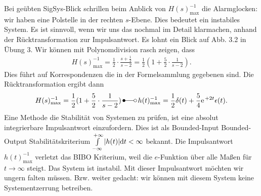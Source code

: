 \begin{ExCalc}
Bei geübten SigSys-Blick schrillen beim Anblick von $H(s)_\mathrm{max}^{-1}$
die Alarmglocken: wir haben eine Polstelle in der rechten $s$-Ebene.
Dies bedeutet ein instabiles System.
Es ist sinnvoll, wenn wir uns das nochmal im Detail klarmachen, anhand der
Rücktransformation zur Impulsantwort.
Es lohnt ein Blick auf Abb. 3.2 in Übung 3.
%
Wir können mit Polynomdivision rasch zeigen, dass
\begin{align}
H(s)_\mathrm{max}^{-1} = \frac{1}{2}\cdot\frac{s+\frac{1}{2}}{s-2}
= \frac{1}{2} ( 1 + \frac{5}{2}\cdot\frac{1}{s-2}).
\end{align}
Dies führt auf Korrespondenzen die in der Formelsammlung gegebenen
sind.
Die Rücktransformation ergibt dann
\begin{align}
H(s)_\mathrm{max}^{-1} = \frac{1}{2} ( 1 + \frac{5}{2}\cdot\frac{1}{s-2})
\,\Laplace\,
h(t)_\mathrm{max}^{-1} = \frac{1}{2}\delta(t) + \frac{5}{4}\e^{+2 t}\epsilon(t).
\end{align}
%
Eine Methode die Stabilität von Systemen zu prüfen, ist eine absolut integrierbare
Impulsantwort einzufordern. Dies ist als Bounded-Input Bounded-Output
Stabilitätskriterium
$\int\limits_{-\infty}^{+\infty} |h(t)|\mathrm{d} t < \infty$
bekannt.
Die Impulsantwort $h(t)_\mathrm{max}^{-1} $ verletzt das BIBO Kriterium, weil
die $e$-Funktion über alle Maßen für $t\to\infty$ steigt. Das System ist
instabil.
Mit dieser Impulsantwort möchten wir ungern falten müssen.
Bzw. weiter gedacht: wir können mit diesem System keine Systementzerrung betreiben.
\end{ExCalc}

